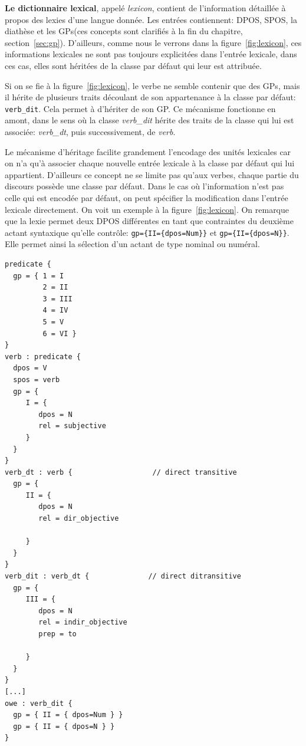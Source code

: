 \textbf{Le dictionnaire lexical}, appelé \emph{lexicon}, contient de l'information détaillée à propos des lexies d'une langue donnée. Les entrées contiennent: \ac{DPOS}, \ac{SPOS}, la diathèse et les \acp{GP}(ces concepts sont clarifiés à la fin du chapitre, section~\ref{sec:gp}).  D'ailleurs, comme nous le verrons dans la figure~\ref{fig:lexicon}, ces informations lexicales ne sont pas toujours explicitées dans l'entrée lexicale, dans ces cas, elles sont héritées de la classe par défaut qui leur est attribuée.

Si on se fie à la figure~\ref{fig:lexicon}, le verbe  ne semble contenir que des \acp{GP}, mais il hérite de plusieurs traits découlant de son appartenance à la classe par défaut: \texttt{verb\_dit}. Cela permet à  d'hériter de son \ac{GP}. Ce mécanisme fonctionne en amont, dans le sens où la classe \emph{verb\_dit} hérite des traits de la classe qui lui est associée: \emph{verb\_dt}, puis successivement, de \emph{verb}.

Le mécanisme d'héritage facilite grandement l'encodage des unités lexicales car on n'a qu'à associer chaque nouvelle entrée lexicale à la classe par défaut qui lui appartient. D'ailleurs ce concept ne se limite pas qu'aux verbes, chaque partie du discours possède une classe par défaut. Dans le cas où l'information n'est pas celle qui est encodée par défaut, on peut spécifier la modification dans l'entrée lexicale directement. On voit un exemple à la figure~\ref{fig:lexicon}. On remarque que la lexie  permet deux \ac{DPOS} différentes en tant que contraintes du deuxième actant syntaxique qu'elle contrôle: \lstinline!gp={II={dpos=Num}}! et \lstinline!gp={II={dpos=N}}!. Elle permet ainsi la sélection d'un actant de type nominal ou numéral.

\begin{lstlisting}[language=Xml, caption = Échantillon du \emph{lexicon}, label=fig:lexicon]
predicate {
  gp = { 1 = I
         2 = II
         3 = III
         4 = IV
         5 = V
         6 = VI }
}
verb : predicate {
  dpos = V
  spos = verb
  gp = {
     I = {
        dpos = N
        rel = subjective
     }
  }
}
verb_dt : verb {                   // direct transitive
  gp = {
     II = {
        dpos = N
        rel = dir_objective

     }
  }
}
verb_dit : verb_dt {              // direct ditransitive
  gp = {
     III = {
        dpos = N
        rel = indir_objective
        prep = to  

     }
  }
}
[...]
owe : verb_dit {
  gp = { II = { dpos=Num } }
  gp = { II = { dpos=N } }
}
\end{lstlisting}



